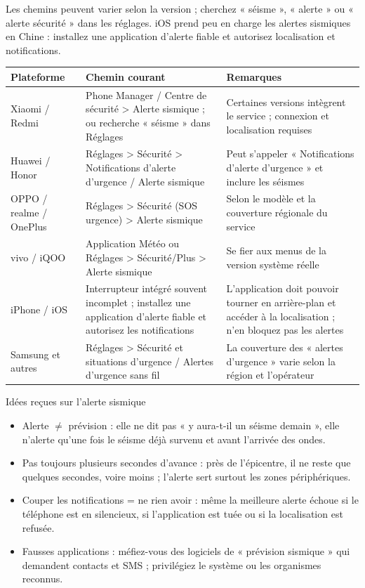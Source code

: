 
Les chemins peuvent varier selon la version ; cherchez « séisme », « alerte » ou « alerte sécurité » dans les réglages. iOS prend peu en charge les alertes sismiques en Chine : installez une application d'alerte fiable et autorisez localisation et notifications.

\begin{center}
\begin{tabularx}{\linewidth}{|X|X|X|}
\hline
\textbf{Plateforme} & \textbf{Chemin courant} & \textbf{Remarques} \tabularnewline
\hline
Xiaomi / Redmi & Phone Manager / Centre de sécurité > Alerte sismique ; ou recherche « séisme » dans Réglages & Certaines versions intègrent le service ; connexion et localisation requises \tabularnewline
Huawei / Honor & Réglages > Sécurité > Notifications d'alerte d'urgence / Alerte sismique & Peut s'appeler « Notifications d'alerte d'urgence » et inclure les séismes \tabularnewline
OPPO / realme / OnePlus & Réglages > Sécurité (SOS urgence) > Alerte sismique & Selon le modèle et la couverture régionale du service \tabularnewline
vivo / iQOO & Application Météo ou Réglages > Sécurité/Plus > Alerte sismique & Se fier aux menus de la version système réelle \tabularnewline
iPhone / iOS & Interrupteur intégré souvent incomplet ; installez une application d'alerte fiable et autorisez les notifications & L'application doit pouvoir tourner en arrière-plan et accéder à la localisation ; n'en bloquez pas les alertes \tabularnewline
Samsung et autres & Réglages > Sécurité et situations d'urgence / Alertes d'urgence sans fil & La couverture des « alertes d'urgence » varie selon la région et l'opérateur \tabularnewline
\hline
\end{tabularx}
\end{center}

\begin{tcbwarn}{Idées reçues sur l'alerte sismique}
\begin{itemize}
  \item Alerte $\neq$ prévision : elle ne dit pas « y aura-t-il un séisme demain », elle n'alerte qu'une fois le séisme déjà survenu et avant l'arrivée des ondes.
  \item Pas toujours plusieurs secondes d'avance : près de l'épicentre, il ne reste que quelques secondes, voire moins ; l'alerte sert surtout les zones périphériques.
  \item Couper les notifications = ne rien avoir : même la meilleure alerte échoue si le téléphone est en silencieux, si l'application est tuée ou si la localisation est refusée.
  \item Fausses applications : méfiez-vous des logiciels de « prévision sismique » qui demandent contacts et SMS ; privilégiez le système ou les organismes reconnus.
\end{itemize}

\end{tcbwarn}

